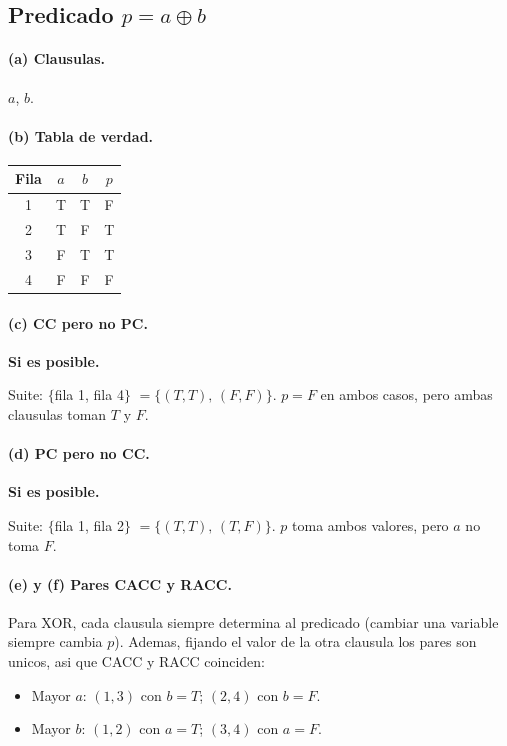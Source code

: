 \documentclass[12pt,a4paper]{article}
\begin{document}
\subsection{Predicado $p = a \oplus b$}

\paragraph{(a) Clausulas.} $a$, $b$.

\paragraph{(b) Tabla de verdad.}

\begin{center}
\begin{tabular}{cccc}
\toprule
Fila & $a$ & $b$ & $p$ \\
\midrule
1 & T & T & F \\
2 & T & F & T \\
3 & F & T & T \\
4 & F & F & F \\
\bottomrule
\end{tabular}
\end{center}

\paragraph{(c) CC pero no PC.} \textbf{Si es posible.}

Suite: $\{$fila 1, fila 4$\}$ $=\{(T,T),\,(F,F)\}$. $p=F$ en ambos casos, pero ambas clausulas
toman $T$ y $F$.

\paragraph{(d) PC pero no CC.} \textbf{Si es posible.}

Suite: $\{$fila 1, fila 2$\}$ $=\{(T,T),\,(T,F)\}$. $p$ toma ambos valores, pero $a$ no toma $F$.

\paragraph{(e) y (f) Pares CACC y RACC.} Para XOR, cada clausula siempre determina al predicado
(cambiar una variable siempre cambia $p$). Ademas, fijando el valor de la otra clausula los
pares son unicos, asi que CACC y RACC coinciden:

\begin{itemize}
  \item Mayor $a$: $(1,3)$ con $b=T$; $(2,4)$ con $b=F$.
  \item Mayor $b$: $(1,2)$ con $a=T$; $(3,4)$ con $a=F$.
\end{itemize}
\end{document}
